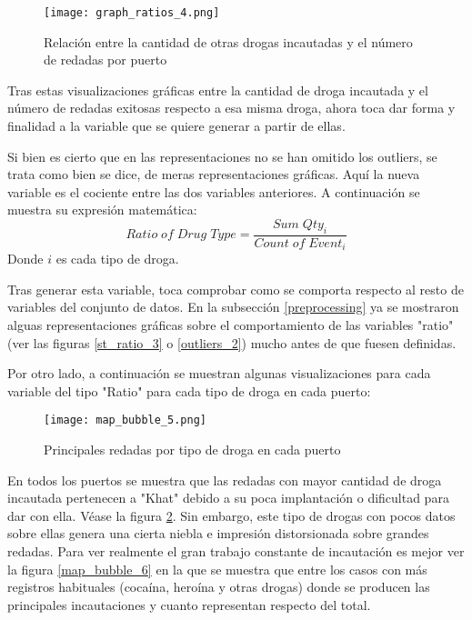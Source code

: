 \documentclass[12pt]{article}
\begin{document}
		\begin{figure}[H]
			\caption{\label{graph_ratios_4} Relación entre la cantidad de otras drogas incautadas y el número de redadas por puerto}
			\centering
			\hspace*{1cm}
			\texttt{[image: graph\_ratios\_4.png]}
		\end{figure}
		
		Tras estas visualizaciones gráficas entre la cantidad de droga incautada y el número de redadas exitosas respecto a esa misma droga, ahora toca dar forma y finalidad a la variable que se quiere generar a partir de ellas.
		
		Si bien es cierto que en las representaciones no se han omitido los outliers, se trata como bien se dice, de meras representaciones gráficas. Aquí la nueva variable es el cociente entre las dos variables anteriores. A continuación se muestra su expresión matemática: 
		$$
		Ratio\; of\; Drug\; Type = \frac{Sum\; Qty_i}{Count\; of\; Event_i}
		$$
		Donde $i$ es cada tipo de droga.
		
		Tras generar esta variable, toca comprobar como se comporta respecto al resto de variables del conjunto de datos. En la subsección \ref{preprocessing} ya se mostraron alguas representaciones gráficas sobre el comportamiento de las variables "ratio" (ver las figuras \ref{st_ratio_3} o \ref{outliers_2}) mucho antes de que fuesen definidas.
		
		Por otro lado, a continuación se muestran algunas visualizaciones para cada variable del tipo "Ratio" para cada tipo de droga en cada puerto:
		
		\begin{figure}[H]
			\caption{\label{map_bubble_5} Principales redadas por tipo de droga en cada puerto}
			\centering
			\hspace*{1cm}
			\texttt{[image: map\_bubble\_5.png]}
		\end{figure}
		
		En todos los puertos se muestra que las redadas con mayor cantidad de droga incautada pertenecen a "Khat" debido a su poca implantación o dificultad para dar con ella. Véase la figura \ref{map_bubble_5}. Sin embargo, este tipo de drogas con pocos datos sobre ellas genera una cierta niebla e impresión distorsionada sobre grandes redadas. Para ver realmente el gran trabajo constante de incautación es mejor ver la figura \ref{map_bubble_6} en la que se muestra que entre los casos con más registros habituales (cocaína, heroína y otras drogas) donde se producen las principales incautaciones y cuanto representan respecto del total.
		
\end{document}
